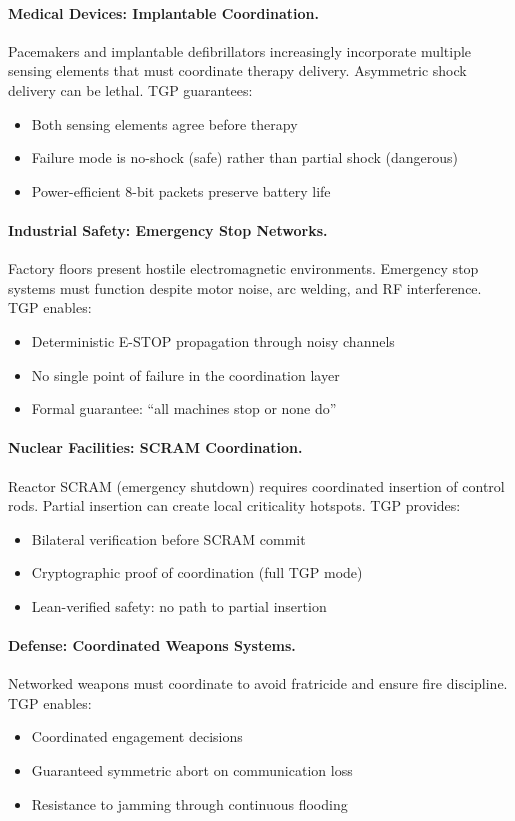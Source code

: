 \paragraph{Medical Devices: Implantable Coordination.}
Pacemakers and implantable defibrillators increasingly incorporate multiple sensing elements that must coordinate therapy delivery. Asymmetric shock delivery can be lethal. TGP guarantees:
\begin{itemize}
    \item Both sensing elements agree before therapy
    \item Failure mode is no-shock (safe) rather than partial shock (dangerous)
    \item Power-efficient 8-bit packets preserve battery life
\end{itemize}

\paragraph{Industrial Safety: Emergency Stop Networks.}
Factory floors present hostile electromagnetic environments. Emergency stop systems must function despite motor noise, arc welding, and RF interference. TGP enables:
\begin{itemize}
    \item Deterministic E-STOP propagation through noisy channels
    \item No single point of failure in the coordination layer
    \item Formal guarantee: ``all machines stop or none do''
\end{itemize}

\paragraph{Nuclear Facilities: SCRAM Coordination.}
Reactor SCRAM (emergency shutdown) requires coordinated insertion of control rods. Partial insertion can create local criticality hotspots. TGP provides:
\begin{itemize}
    \item Bilateral verification before SCRAM commit
    \item Cryptographic proof of coordination (full TGP mode)
    \item Lean-verified safety: no path to partial insertion
\end{itemize}

\paragraph{Defense: Coordinated Weapons Systems.}
Networked weapons must coordinate to avoid fratricide and ensure fire discipline. TGP enables:
\begin{itemize}
    \item Coordinated engagement decisions
    \item Guaranteed symmetric abort on communication loss
    \item Resistance to jamming through continuous flooding
\end{itemize}

